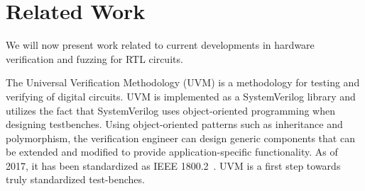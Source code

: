 \documentclass[conference]{IEEEtran}
\newcommand{\martin}[1]{{\color{blue} Martin: #1}}
\newcommand{\andrew}[1]{{\color{red} Andrew: #1}}
\newcommand{\rewrite}[1]{{\color{red} rewrite: #1}}
\begin{document}
%
%
%
%
%


\section{Related Work}
\label{sec:related}
We will now present work related to current developments in hardware verification and fuzzing for RTL circuits.
%

The Universal Verification Methodology (UVM) is a methodology for testing and verifying of digital circuits.
UVM is implemented as a SystemVerilog library and utilizes the fact that SystemVerilog uses object-oriented programming when designing testbenches.
Using object-oriented patterns such as inheritance and polymorphism, the verification engineer can design generic components that can be extended and modified to provide application-specific functionality.
As of 2017, it has been standardized as IEEE 1800.2~\cite{IEEE:18002}.
UVM is a first step towards truly standardized test-benches.
\end{document}
